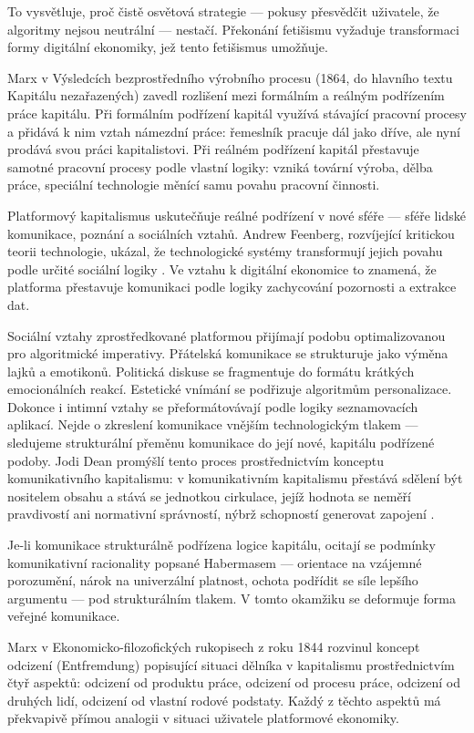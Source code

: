 To vysvětluje, proč čistě osvětová strategie — pokusy přesvědčit uživatele, že algoritmy nejsou neutrální — nestačí. Překonání fetišismu vyžaduje transformaci formy digitální ekonomiky, jež tento fetišismus umožňuje.


Marx v Výsledcích bezprostředního výrobního procesu (1864, do hlavního textu Kapitálu nezařazených) \parencite{Marx64} zavedl rozlišení mezi formálním a reálným podřízením práce kapitálu.
Při formálním podřízení kapitál využívá stávající pracovní procesy a přidává k nim vztah námezdní práce: řemeslník pracuje dál jako dříve, ale nyní prodává svou práci kapitalistovi. Při reálném podřízení kapitál přestavuje samotné pracovní procesy podle vlastní logiky: vzniká tovární výroba, dělba práce, speciální technologie měnící samu povahu pracovní činnosti.

Platformový kapitalismus uskutečňuje reálné podřízení v nové sféře — sféře lidské komunikace, poznání a sociálních vztahů. Andrew Feenberg, rozvíjející kritickou teorii technologie, ukázal, že technologické systémy transformují jejich povahu podle určité sociální logiky \parencite{Feenberg02}. Ve vztahu k digitální ekonomice to znamená, že platforma přestavuje komunikaci podle logiky zachycování pozornosti a extrakce dat.

Sociální vztahy zprostředkované platformou přijímají podobu optimalizovanou pro algoritmické imperativy. Přátelská komunikace se strukturuje jako výměna lajků a emotikonů. Politická diskuse se fragmentuje do formátu krátkých emocionálních reakcí. Estetické vnímání se podřizuje algoritmům personalizace. Dokonce i intimní vztahy se přeformátovávají podle logiky seznamovacích aplikací. Nejde o zkreslení  komunikace vnějším technologickým tlakem — sledujeme strukturální přeměnu komunikace do její nové, kapitálu podřízené podoby. Jodi Dean promýšlí tento proces prostřednictvím konceptu komunikativního kapitalismu: v komunikativním kapitalismu přestává sdělení být nositelem obsahu a stává se jednotkou cirkulace, jejíž hodnota se neměří pravdivostí ani normativní správností, nýbrž schopností generovat zapojení \parencite{Dean09}.

Je-li komunikace strukturálně podřízena logice kapitálu, ocitají se podmínky komunikativní racionality popsané Habermasem — orientace na vzájemné porozumění, nárok na univerzální platnost, ochota podřídit se síle lepšího argumentu — pod strukturálním tlakem. V tomto okamžiku se deformuje forma veřejné komunikace.


Marx v Ekonomicko-filozofických rukopisech z roku 1844 \parencite{Marx44} rozvinul koncept odcizení (Entfremdung) popisující situaci dělníka v kapitalismu prostřednictvím čtyř aspektů: odcizení od produktu práce, odcizení od procesu práce, odcizení od druhých lidí, odcizení od vlastní rodové podstaty. Každý z těchto aspektů má překvapivě přímou analogii v situaci uživatele platformové ekonomiky.

